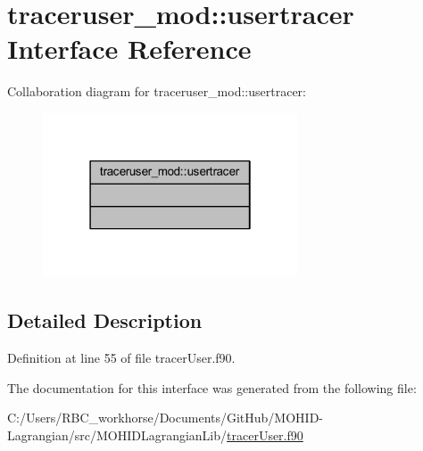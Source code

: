 \hypertarget{interfacetraceruser__mod_1_1usertracer}{}\section{traceruser\+\_\+mod\+:\+:usertracer Interface Reference}
\label{interfacetraceruser__mod_1_1usertracer}


Collaboration diagram for traceruser\+\_\+mod\+:\+:usertracer\+:\nopagebreak
\begin{figure}[H]
\begin{center}
\leavevmode
\includegraphics[width=214pt]{interfacetraceruser__mod_1_1usertracer__coll__graph}
\end{center}
\end{figure}


\subsection{Detailed Description}


Definition at line 55 of file tracer\+User.\+f90.



The documentation for this interface was generated from the following file\+:\begin{DoxyCompactItemize}
\item 
C\+:/\+Users/\+R\+B\+C\+\_\+workhorse/\+Documents/\+Git\+Hub/\+M\+O\+H\+I\+D-\/\+Lagrangian/src/\+M\+O\+H\+I\+D\+Lagrangian\+Lib/\mbox{\hyperlink{tracer_user_8f90}{tracer\+User.\+f90}}\end{DoxyCompactItemize}
